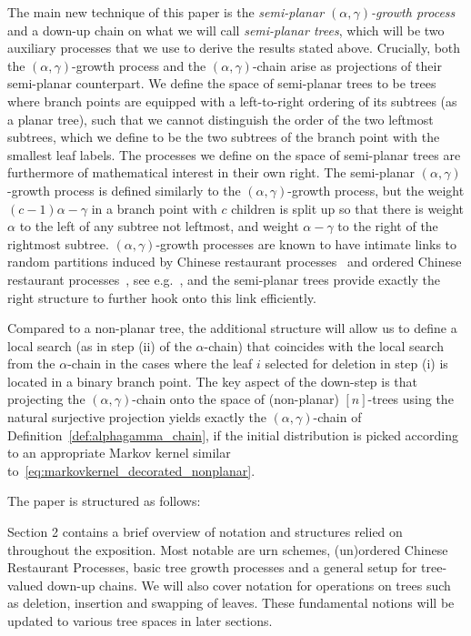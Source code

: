 \documentclass[a4paper, final]{amsart}
\theoremstyle{plain}
\theoremstyle{definition}
\begin{document}
The main new technique of this paper is the \textit{semi-planar $(\alpha, \gamma)$-growth process} and a down-up chain on what we will call \textit{semi-planar trees}, which will be two auxiliary processes that we use to derive the results stated above.
Crucially, both the $(\alpha, \gamma)$-growth process and the $(\alpha, \gamma)$-chain arise as projections of their semi-planar counterpart. 
We define the space of semi-planar trees to be trees where branch points are equipped with a left-to-right ordering of its subtrees (as a planar tree), such that we cannot distinguish the order of the two leftmost subtrees, which we define to be the two subtrees of the branch point with the smallest leaf labels.
The processes we define on the space of semi-planar trees are furthermore of mathematical interest in their own right.
The semi-planar $(\alpha, \gamma)$-growth process is defined similarly to the $(\alpha, \gamma)$-growth process, but the weight $(c-1)\alpha - \gamma$ in a branch point with $c$ children is split up so that there is weight $\alpha$ to the left of any subtree not leftmost, and weight $\alpha - \gamma$ to the right of the rightmost subtree.
$(\alpha, \gamma)$-growth processes are known to have intimate links to random partitions induced by Chinese restaurant processes~\cite{MR883646, RefWorks:doc:5b644f76e4b0a3434e490fc8} and ordered Chinese restaurant processes~\cite{RefWorks:doc:5b6c5580e4b0a3935d3436d8}, see e.g.~\cite{MR2606082, RefWorks:doc:5b4cbb5fe4b02dc0c79270af, RefWorks:doc:5b6c5580e4b0a3935d3436d8}, and the semi-planar trees provide exactly the right structure to further hook onto this link efficiently.

Compared to a non-planar tree, the additional structure will allow us to define a local search (as in step (ii) of the $\alpha$-chain) that coincides with the local search from the $\alpha$-chain in the cases where the leaf $i$ selected for deletion in step (i) is located in a binary branch point.
The key aspect of the down-step is that projecting the $(\alpha, \gamma)$-chain onto the space of (non-planar) $[n]$-trees using the natural surjective projection yields exactly the $(\alpha, \gamma)$-chain of Definition~\ref{def:alphagamma_chain}, if the initial distribution is picked according to an appropriate Markov kernel similar to~\eqref{eq:markovkernel_decorated_nonplanar}.

The paper is structured as follows:

Section 2 contains a brief overview of notation and structures relied on throughout the exposition.
Most notable are urn schemes, (un)ordered Chinese Restaurant Processes, basic tree growth processes and a general setup for tree-valued down-up chains.
We will also cover notation for operations on trees such as deletion, insertion and swapping of leaves.
These fundamental notions will be updated to various tree spaces in later sections.
\end{document}
